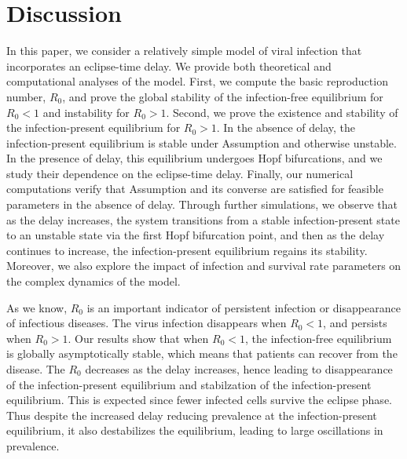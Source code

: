 \documentclass{CMHPhD-SIVD}
\begin{document}
\section{Discussion} \label{sec5}
In this paper, we consider a relatively simple model of viral infection that incorporates an eclipse-time delay. We provide both theoretical and computational analyses of the
model. First, we compute the basic reproduction number, $R_0$, and prove the global
stability of the infection-free equilibrium for $R_0<1$ and instability for $R_0>1$. Second, we prove the existence and stability of the infection-present equilibrium for $R_0>1$.
In the absence of delay, the infection-present equilibrium is stable under Assumption  and otherwise unstable. In the presence of delay, this equilibrium undergoes Hopf
bifurcations, and we study their dependence on the eclipse-time delay. Finally, our numerical computations verify that Assumption  and its converse are satisfied for feasible parameters in the absence of delay. Through further simulations, we observe that as the delay increases, the system transitions from a stable infection-present state to an unstable state via the first Hopf bifurcation point, and then as the delay continues
to increase, the infection-present equilibrium regains its stability. Moreover, we also explore the impact of infection and survival rate parameters on the complex dynamics of the model.

As we know, $R_0$ is an important indicator of persistent infection or disappearance of infectious diseases. The virus infection disappears when $R_0<1$, and persists when
$R_0>1$. Our results show that when $R_0<1$, the infection-free equilibrium is globally
asymptotically stable, which means that patients can recover from the disease. The $R_0$
decreases as the delay increases, hence leading to disappearance of the infection-present
equilibrium and stabilzation of the infection-present equilibrium. This is expected since fewer infected cells survive the eclipse phase. Thus despite the increased delay reducing
prevalence at the infection-present equilibrium, it also destabilizes the equilibrium,
leading to large oscillations in prevalence.
\end{document}
